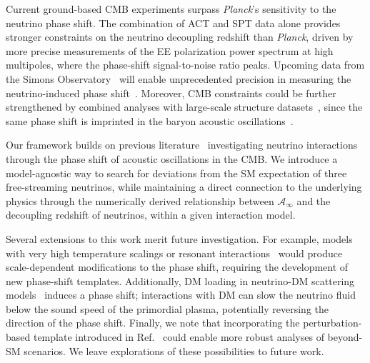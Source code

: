\documentclass[aps,prd,twocolumn,showpacs,superscriptaddress,nofootinbib,preprintnumbers]{revtex4-2}
\begin{document}
Current ground-based CMB experiments surpass \textit{Planck}'s sensitivity to the neutrino phase shift. The combination of ACT and SPT data alone provides stronger constraints on the neutrino decoupling redshift than \textit{Planck}, driven by more precise measurements of the EE polarization power spectrum at high multipoles, where the phase-shift signal-to-noise ratio peaks.
Upcoming data from the Simons Observatory~\cite{SimonsObservatory:2025wwn} will enable unprecedented precision in measuring the neutrino-induced phase shift~\cite{Montefalcone:2025unv}. Moreover, CMB constraints could be further strengthened by combined analyses with large-scale structure datasets~\cite{Baumann:2017gkg,Baumann:2019keh,Whitford:2024ecj}, since the same phase shift is imprinted in the baryon acoustic oscillations~\cite{Baumann:2017lmt,Baumann:2017gkg,Green:2020fjb, Montefalcone:2025mbg}.

Our framework builds on previous literature~\cite{Follin:2015hya, Baumann:2015rya, Pan:2016zla, Baumann:2017gkg, Choi:2018gho, Baumann:2019keh,Ghosh:2019tab,Brinckmann:2020bcn,Ge:2022qws,Taule:2022jrz,Ghosh:2024wva,Whitford:2024ecj,Montefalcone:2025unv, Saravanan:2025cyi, Montefalcone:2025mbg} investigating neutrino interactions through the phase shift of acoustic oscillations in the CMB. We introduce a model-agnostic way to search for deviations from the SM expectation of three free-streaming neutrinos, while maintaining a direct connection to the underlying physics through the numerically derived relationship between $\mathcal{A}_\infty$ and the decoupling redshift of neutrinos, within a given interaction model. 

Several extensions to this work merit future investigation. For example, models with very high temperature scalings or resonant interactions~\cite{Creque-Sarbinowski:2020qhz,Venzor:2023aka,Noriega:2025ulc} would produce scale-dependent modifications to the phase shift, requiring the development of new phase-shift templates. Additionally, DM loading in neutrino-DM scattering models~\cite{Ghosh:2024wva} induces a phase shift; interactions with DM can slow the neutrino fluid below the sound speed of the primordial plasma, potentially reversing the direction of the phase shift. Finally, we note that incorporating the perturbation-based template introduced in Ref.~\cite{Montefalcone:2025unv} could enable more robust analyses of beyond-SM scenarios. We leave explorations of these possibilities to future work.
\end{document}
